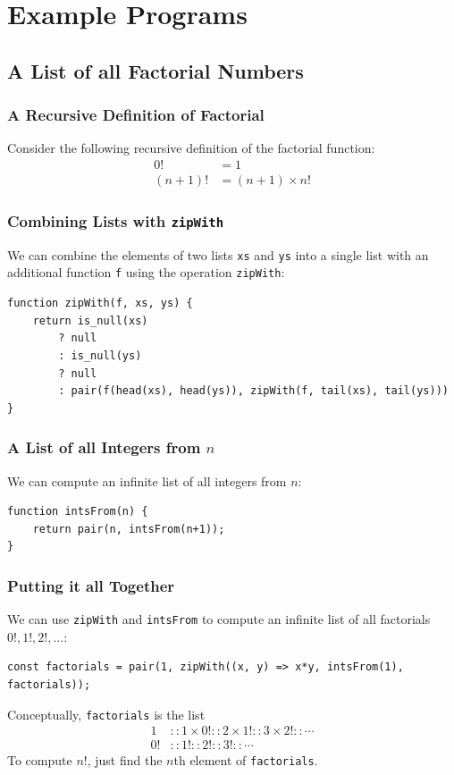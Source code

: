 \documentclass[12pt]{beamer}
\begin{document}
\section{Example Programs}


\subsection{A List of all Factorial Numbers}

\begin{frame}
\frametitle{A Recursive Definition of Factorial}
Consider the following recursive definition of the factorial function:
\begin{align*}
0! &= 1 \\
(n+1)! &= (n+1)\times n!
\end{align*}
\end{frame}

\begin{frame}[fragile]
\frametitle{Combining Lists with \texttt{zipWith}}
We can combine the elements of two lists \texttt{xs} and \texttt{ys} into a single list with an additional function \texttt{f} using the operation \texttt{zipWith}:
\begin{lstlisting}
function zipWith(f, xs, ys) {
	return is_null(xs)
		? null
		: is_null(ys)
		? null
		: pair(f(head(xs), head(ys)), zipWith(f, tail(xs), tail(ys)))
}
\end{lstlisting}
\end{frame}

\begin{frame}[fragile]
\frametitle{A List of all Integers from $n$}
We can compute an infinite list of all integers from $n$:
\begin{lstlisting}
function intsFrom(n) {
	return pair(n, intsFrom(n+1));
}
\end{lstlisting}
\end{frame}

\begin{frame}[fragile]
\frametitle{Putting it all Together}
We can use \texttt{zipWith} and \texttt{intsFrom} to compute an infinite list of all factorials $0!, 1!, 2!,\ldots$:
\begin{lstlisting}
const factorials = pair(1, zipWith((x, y) => x*y, intsFrom(1), factorials));
\end{lstlisting}\pause
Conceptually, \texttt{factorials} is the list
\begin{align*}
1 &:: 1 \times 0! :: 2 \times 1! :: 3 \times 2! :: \cdots \\
0! &:: 1! :: 2! :: 3! :: \cdots
\end{align*}
To compute $n!$, just find the $n$th element of \texttt{factorials}.
\end{frame}
\end{document}
